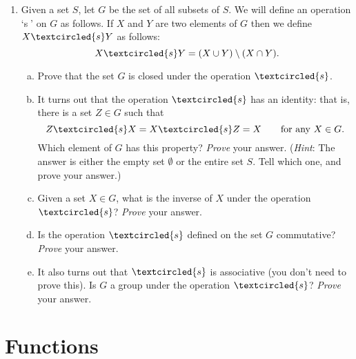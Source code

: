 \begin{enumerate}
\item
Given a set $S$, let $G$ be the set of all subsets of $S$. We will define an operation `\textcircled{s}' on $G$ as follows.  If $X$ and $Y$ are two elements of $G$  then we define $X \textcircled{s} Y$ as follows:
\[ X \textcircled{s} Y = (X \cup Y) \setminus (X \cap Y) .\]
\begin{enumerate}[(a)]
\item
Prove that the set $G$ is closed under the operation $\textcircled{s}$.
\item
It turns out that the operation $\textcircled{s}$ has an identity: that is, there is a set $Z \in G$ such that
\[  Z \textcircled{s} X = X \textcircled{s} Z = X  \qquad \text{for any $X \in G$.} \]
Which element of $G$ has this property?  \emph{Prove} your answer.  (\emph{Hint}:  The answer is either the empty set $\emptyset$ or the entire set $S$. Tell which one, and prove your answer.)  
\item
Given a set $X \in G$, what is the inverse of $X$ under the operation $\textcircled{s}$?  \emph{Prove} your answer. 
\item
Is the operation $\textcircled{s}$ defined on the set $G$ commutative? \emph{Prove} your answer. 
\item
It also turns out that $\textcircled{s}$ is associative (you don't need to prove this).  Is $G$ a group under the operation $\textcircled{s}$?  \emph{Prove} your answer.
\end{enumerate}


\end{enumerate}

\section{Functions}

